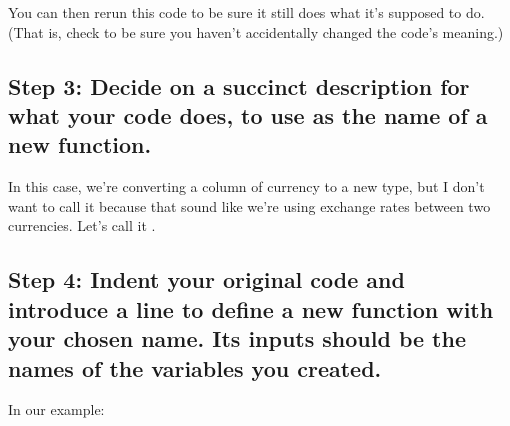 \documentclass[letterpaper,10pt,english]{jupyterBook}
\begin{document}
\sphinxAtStartPar
You can then re\sphinxhyphen{}run this code to be sure it still does what it’s supposed to do.   (That is, check to be sure you haven’t accidentally changed the code’s meaning.)


\subsection{Step 3:  Decide on a succinct description for what your code does, to use as the name of a new function.}
\label{\detokenize{chapter-7-abstraction:step-3-decide-on-a-succinct-description-for-what-your-code-does-to-use-as-the-name-of-a-new-function}}
\sphinxAtStartPar
In this case, we’re converting a column of currency to a new type, but I don’t want to call it  because that sound like we’re using exchange rates between two currencies.  Let’s call it .


\subsection{Step 4:  Indent your original code and introduce a  line to define a new function with your chosen name.  Its inputs should be the names of the variables you created.}
\label{\detokenize{chapter-7-abstraction:step-4-indent-your-original-code-and-introduce-a-def-line-to-define-a-new-function-with-your-chosen-name-its-inputs-should-be-the-names-of-the-variables-you-created}}
\sphinxAtStartPar
In our example:

\begin{sphinxVerbatim}[commandchars=\\\{\}]
     
    \PYG{p}{[}\PYG{p}{]}  \PYG{p}{[}\PYG{p}{]}    
    \PYG{p}{[}\PYG{p}{]}  \PYG{p}{[}\PYG{p}{]}    
    \PYG{p}{[}\PYG{p}{]}  \PYG{p}{[}\PYG{p}{]}       
\end{sphinxVerbatim}
\end{document}
